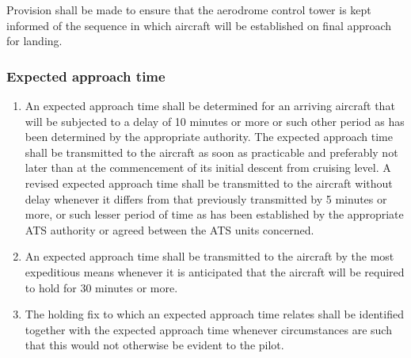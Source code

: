 \documentclass[../main.tex]{subfiles}
\begin{document}
\begin{enumeratesc}
\begin{enumerate}[labelindent=0pt,itemsep=0.2cm]
            \noindent Provision shall be made to ensure that the aerodrome control tower is kept informed of the sequence in which aircraft will be established on final approach for landing.



        \end{enumerate}
    \end{enumeratesc}

    \subsubsection{Expected approach time}

    \begin{enumerate}
        \item An expected approach time shall be determined for an arriving aircraft that will be subjected to a delay of 10 minutes or more or such other period as has been determined by the appropriate authority. The expected approach time shall be transmitted to the aircraft as soon as practicable and preferably not later than at the commencement of its initial descent from cruising level. A revised expected approach time shall be transmitted to the aircraft without delay whenever it differs from that previously transmitted by 5 minutes or more, or such lesser period of time as has been established by the appropriate ATS authority or agreed between the ATS units concerned.
        \item An expected approach time shall be transmitted to the aircraft by the most expeditious means whenever it is anticipated that the aircraft will be required to hold for 30 minutes or more.
        \item The holding fix to which an expected approach time relates shall be identified together with the expected approach time whenever circumstances are such that this would not otherwise be evident to the pilot.
    \end{enumerate}
\end{document}
